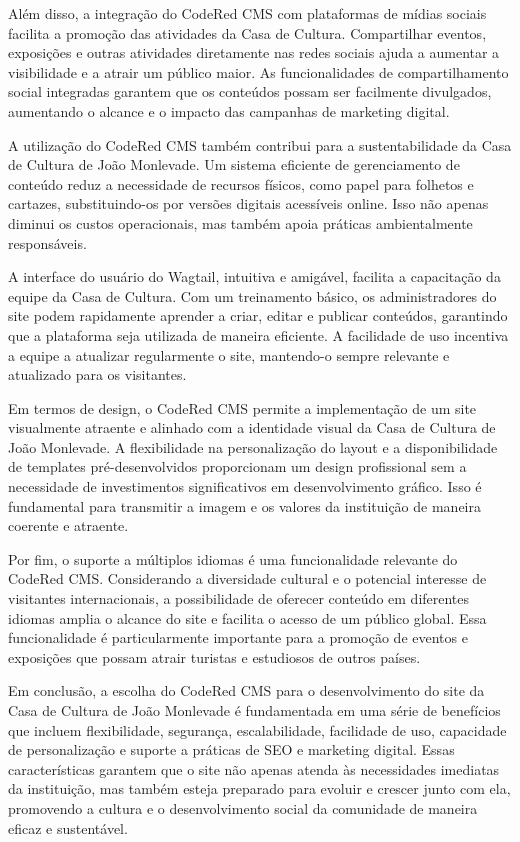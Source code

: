Além disso, a integração do CodeRed CMS com plataformas de mídias sociais facilita a promoção das atividades da Casa de Cultura. Compartilhar eventos, exposições e outras atividades diretamente nas redes sociais ajuda a aumentar a visibilidade e a atrair um público maior. As funcionalidades de compartilhamento social integradas garantem que os conteúdos possam ser facilmente divulgados, aumentando o alcance e o impacto das campanhas de marketing digital.

A utilização do CodeRed CMS também contribui para a sustentabilidade da Casa de Cultura de João Monlevade. Um sistema eficiente de gerenciamento de conteúdo reduz a necessidade de recursos físicos, como papel para folhetos e cartazes, substituindo-os por versões digitais acessíveis online. Isso não apenas diminui os custos operacionais, mas também apoia práticas ambientalmente responsáveis.

A interface do usuário do Wagtail, intuitiva e amigável, facilita a capacitação da equipe da Casa de Cultura. Com um treinamento básico, os administradores do site podem rapidamente aprender a criar, editar e publicar conteúdos, garantindo que a plataforma seja utilizada de maneira eficiente. A facilidade de uso incentiva a equipe a atualizar regularmente o site, mantendo-o sempre relevante e atualizado para os visitantes.

Em termos de design, o CodeRed CMS permite a implementação de um site visualmente atraente e alinhado com a identidade visual da Casa de Cultura de João Monlevade. A flexibilidade na personalização do layout e a disponibilidade de templates pré-desenvolvidos proporcionam um design profissional sem a necessidade de investimentos significativos em desenvolvimento gráfico. Isso é fundamental para transmitir a imagem e os valores da instituição de maneira coerente e atraente.

Por fim, o suporte a múltiplos idiomas é uma funcionalidade relevante do CodeRed CMS. Considerando a diversidade cultural e o potencial interesse de visitantes internacionais, a possibilidade de oferecer conteúdo em diferentes idiomas amplia o alcance do site e facilita o acesso de um público global. Essa funcionalidade é particularmente importante para a promoção de eventos e exposições que possam atrair turistas e estudiosos de outros países.

Em conclusão, a escolha do CodeRed CMS para o desenvolvimento do site da Casa de Cultura de João Monlevade é fundamentada em uma série de benefícios que incluem flexibilidade, segurança, escalabilidade, facilidade de uso, capacidade de personalização e suporte a práticas de SEO e marketing digital. Essas características garantem que o site não apenas atenda às necessidades imediatas da instituição, mas também esteja preparado para evoluir e crescer junto com ela, promovendo a cultura e o desenvolvimento social da comunidade de maneira eficaz e sustentável.

